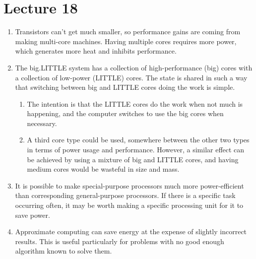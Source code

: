 \documentclass{article}
\begin{document}
\section{Lecture 18}
\begin{enumerate}
  \item Transistors can't get much smaller, so performance gains are coming from making multi-core machines. Having multiple cores requires more power, which generates more heat and inhibits performance.
  \item The big.LITTLE system has a collection of high-performance (big) cores with a collection of low-power (LITTLE) cores. The state is shared in such a way that switching between big and LITTLE cores doing the work is simple.
    \begin{enumerate}
      \item The intention is that the LITTLE cores do the work when not much is happening, and the computer switches to use the big cores when necessary.
      \item A third core type could be used, somewhere between the other two types in terms of power usage and performance. However, a similar effect can be achieved by using a mixture of big and LITTLE cores, and having medium cores would be wasteful in size and mass.
    \end{enumerate}
  \item It is possible to make special-purpose processors much more power-efficient than corresponding general-purpose processors. If there is a specific task occurring often, it may be worth making a specific processing unit for it to save power.
  \item Approximate computing can save energy at the expense of slightly incorrect results. This is useful particularly for problems with no good enough algorithm known to solve them.
\end{enumerate}
\end{document}
